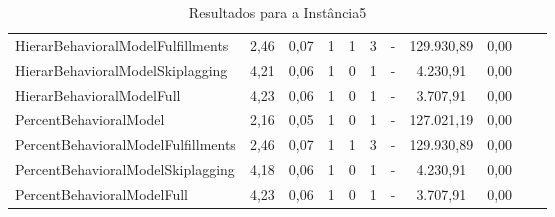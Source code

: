 \begin{table}[h!]
{\begin{tabular}{lcccccccccc}
			HierarBehavioralModelFulfillments  & 2,46   & 0,07 & 1 & 1   & 3 & -          & 129.930,89 & 0,00 \\ 
			HierarBehavioralModelSkiplagging   & 4,21   & 0,06 & 1 & 0   & 1 & -          & 4.230,91   & 0,00 \\ 
			HierarBehavioralModelFull          & 4,23   & 0,06 & 1 & 0   & 1 & -          & 3.707,91   & 0,00 \\ \hline
			PercentBehavioralModel             & 2,16   & 0,05 & 1 & 0   & 1 & -          & 127.021,19 & 0,00 \\ 
			PercentBehavioralModelFulfillments & 2,46   & 0,07 & 1 & 1   & 3 & -          & 129.930,89 & 0,00 \\ 
			PercentBehavioralModelSkiplagging  & 4,18   & 0,06 & 1 & 0   & 1 & -          & 4.230,91   & 0,00 \\ 
			PercentBehavioralModelFull         & 4,23   & 0,06 & 1 & 0   & 1 & -          & 3.707,91   & 0,00 \\ \hline
		\end{tabular}%
	}
	\caption{Resultados para a Instância5}
	\label{tab:resul_instan5}
\end{table}




